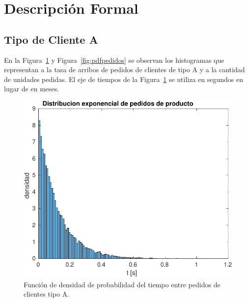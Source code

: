 \documentclass[10pt]{article}
\begin{document}
\section{Descripción Formal}
\subsection{Tipo de Cliente A}

En la Figura~\ref{fig:pdftiempo} y Figura~\ref{fig:pdfpedidos} se observan los histogramas que representan a la tasa de arribos de pedidos de clientes de tipo A y a la cantidad de unidades pedidas. El eje de tiempos de la Figura~\ref{fig:pdftiempo} se utiliza en segundos en lugar de en meses.

\begin{figure}
\centering
\includegraphics[scale=1]{img/pdf_tiempo_pedidos}
\caption{Función de densidad de probabilidad del tiempo entre pedidos de clientes tipo A.}
\label{fig:pdftiempo}
\end{figure}
\end{document}
